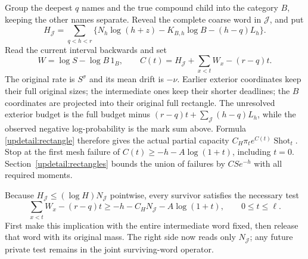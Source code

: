 Group the deepest $q$ names and the true compound child into the
category $B$, keeping the other names separate. Reveal the complete
coarse word in $\mathcal J$, and put
\[
 H_{\mathcal J}=\sum_{q<h<r}
 \{N_h\log(h+z)-K_{B,h}\log B-(h-q)L_h\}.
\]
Read the current interval backwards and set
\[
 W=\log S-\log B\,1_B,\qquad
 C(t)=H_{\mathcal J}+\sum_{x<t}W_x-(r-q)t.
\]
The original rate is $S^\sigma$ and its mean drift is $-\nu$.
Earlier exterior coordinates keep their full original sizes;
the intermediate ones keep their shorter deadlines; the $B$
coordinates are projected into their original full rectangle.
The unresolved exterior budget is the full budget minus
$(r-q)t+\sum_{\mathcal J}(h-q)L_h$, while the observed negative
log-probability is the mark sum above. Formula
\eqref{updetail:rectangle} therefore gives the actual partial capacity
$C_H\pi_t e^{C(t)}\operatorname{Shot}_t$.
Stop at the first mesh failure of
$C(t)\geq-h-A\log(1+t)$, including $t=0$.
Section~\ref{updetail:rectangles} bounds the union of failures by
$CS e^{-h}$ with all required moments.

Because $H_{\mathcal J}\leq(\log H)N_{\mathcal J}$ pointwise,
every survivor satisfies the necessary test
\begin{equation}
 \sum_{x<t}W_x-(r-q)t
 \geq-h-C_HN_{\mathcal J}-A\log(1+t),\qquad 0\leq t\leq\ell.
 \label{updetail:necessary-one-end}
\end{equation}
First make this implication with the entire intermediate word fixed,
then release that word with its original mass. The right side now
reads only $N_{\mathcal J}$; any future private test remains in the
joint surviving-word operator.

